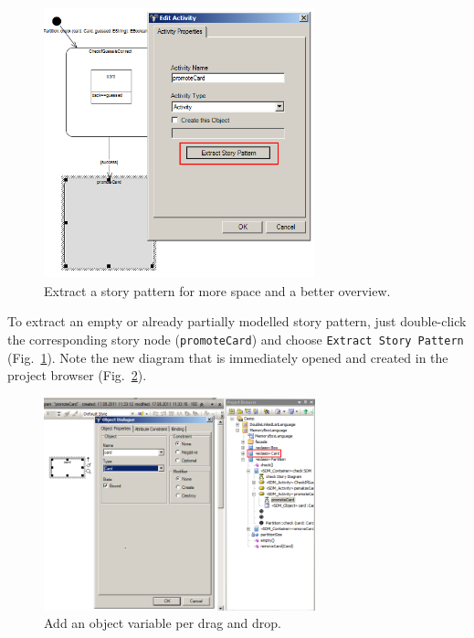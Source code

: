 \begin{figure}[htbp]
\begin{center}
  \includegraphics[width=0.7\textwidth]{pics/sdmBilder/check/sdm21}
  \caption{Extract a story pattern for more space and a better overview.}  
  \label{fig:sdm_check_extract_storypattern}
\end{center}
\end{figure}

To extract an empty or already
partially modelled story pattern, just double-click the corresponding story node
(\texttt{promoteCard}) and choose \texttt{Extract Story Pattern}
(Fig.~\ref{fig:sdm_check_extract_storypattern}). Note the new diagram that is
immediately opened and created in the project browser
(Fig.~\ref{fig:sdm_check_bound_card}).
\clearpage

\begin{figure}[htbp]
\begin{center}
  \includegraphics[width=0.7\textwidth]{pics/sdmBilder/check/sdm22RAW}
  \caption{Add an object variable per drag and drop.}  
  \label{fig:sdm_check_bound_card}
\end{center}
\end{figure}

